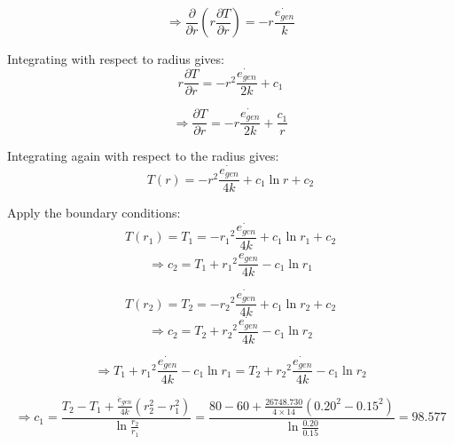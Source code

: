 \documentclass[conf]{new-aiaa}
\begin{document}
\begin{equation*}
    \Rightarrow \frac{\partial}{\partial r}\left(r \frac{\partial T}{\partial r}\right) = - r \frac{\dot{e_{gen}}}{k}
\end{equation*}


\noindent Integrating with respect to radius gives:
\begin{equation*}
    r \frac{\partial T}{\partial r} = - r^2 \frac{\dot{e_{gen}}}{2k} + c_1
\end{equation*}

\begin{equation*}
    \Rightarrow \frac{\partial T}{\partial r} = - r \frac{\dot{e_{gen}}}{2k} + \frac{c_1}{r}
\end{equation*}

\noindent Integrating again with respect to the radius gives:
\begin{equation*}
    T(r) = - r^2 \frac{\dot{e_{gen}}}{4k} + c_1 \ln r + c_2
\end{equation*}

\noindent Apply the boundary conditions:
\begin{equation*}
    T(r_1) = T_1 = - {r_1}^2 \frac{\dot{e_{gen}}}{4k} + c_1 \ln {r_1} + c_2
\end{equation*}
\begin{equation*}
    \Rightarrow c_2 = T_1 + {r_1}^2 \frac{\dot{e_{gen}}}{4k} - c_1 \ln {r_1} 
\end{equation*}
    
\begin{equation*}
    T(r_2) = T_2 = - {r_2}^2 \frac{\dot{e_{gen}}}{4k} + c_1 \ln {r_2} + c_2
\end{equation*}
\begin{equation*}
\Rightarrow c_2 = T_2 + {r_2}^2 \frac{\dot{e_{gen}}}{4k} - c_1 \ln {r_2} 
\end{equation*}


\begin{equation*}
    \Rightarrow T_1 + {r_1}^2 \frac{\dot{e_{gen}}}{4k} - c_1 \ln {r_1}
    = T_2 + {r_2}^2 \frac{\dot{e_{gen}}}{4k} - c_1 \ln {r_2} 
\end{equation*}

\begin{equation*}
    \Rightarrow  c_1 = \frac{T_2 - T_1 + \frac{\dot{e}_{gen}}{4k}\left(r_2^2 - r_1^2\right)} {\ln\frac{r_2}{r_1}} 
    = \frac{80 - 60 + \frac{26748.730}{4\times14}\left(0.20^2 - 0.15^2\right)} {\ln\frac{0.20}{0.15}}
    = 98.577
\end{equation*}
\end{document}
